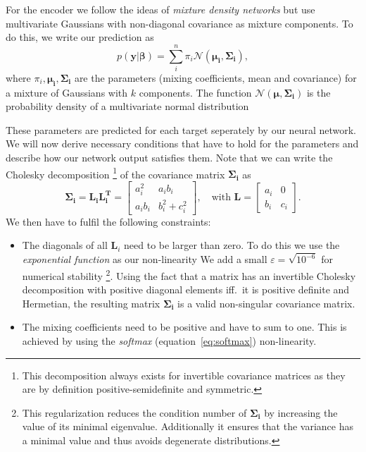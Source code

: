 \documentclass[nobib, a4paper]{tufte-handout}
\begin{document}
For the encoder we follow the ideas of \textit{mixture density networks} but use multivariate Gaussians with non-diagonal covariance as mixture components\autocite{mdn}.
To do this, we write our prediction as
\begin{equation*}
p \left( \bm{y} | \bm{\beta} \right) = \sum_{i}^n \pi_i \mathcal{N} \left( \bm{\mu_i}, \bm{\Sigma_i} \right),
\end{equation*}
where \(\pi_i, \bm{\mu_i}, \bm{\Sigma_i}\) are the parameters (mixing coefficients, mean and covariance) for a mixture of Gaussians with \(k\) components.
The function \(\mathcal{N}(\bm{\mu}, \bm{\Sigma_i})\) is the probability density of a multivariate normal distribution 

These parameters are predicted for each target seperately by our neural network.
We will now derive necessary conditions that have to hold for the parameters and describe how our network output satisfies them.
Note that we can write the Cholesky decomposition%
\footnote{This decomposition always exists for invertible covariance matrices as they are by definition positive-semidefinite and symmetric.}
of the covariance matrix \(\bm{\Sigma_i}\) as
\begin{equation*}
  \bm{\Sigma_i} = \bm{L_i} \bm{L_i^T} =
  \begin{bmatrix}
    a_i^2 & a_ib_i \\
    a_ib_i & b_i^2 + c_i^2
  \end{bmatrix} ,\quad
   \text{with } \bm{L} =
   \begin{bmatrix}
     a_i & 0 \\
     b_i & c_i
   \end{bmatrix}.
\end{equation*}
We then have to fulfil the following constraints:
\begin{itemize}
\item The diagonals of all \(\bm{L}_i\) need to be larger than zero.
  To do this we use the \textit{exponential function} as our non-linearity
  We add a small \(\varepsilon = \sqrt{10^{-6}}\) for numerical stability%
  \footnote{This regularization reduces the condition number of \(\bm{\Sigma_i}\) by increasing the value of its minimal eigenvalue.
  Additionally it ensures that the variance has a minimal value and thus avoids degenerate distributions.}. %
  Using the fact that a matrix has an invertible Cholesky decomposition with positive diagonal elements iff.\ it is positive definite and Hermetian,
  the resulting matrix \(\bm{\Sigma_i}\) is a valid non-singular covariance matrix.
\item The mixing coefficients need to be positive and have to sum to one.
  This is achieved by using the \textit{softmax} (equation~\ref{eq:softmax}) non-linearity.

\end{itemize}
\end{document}
